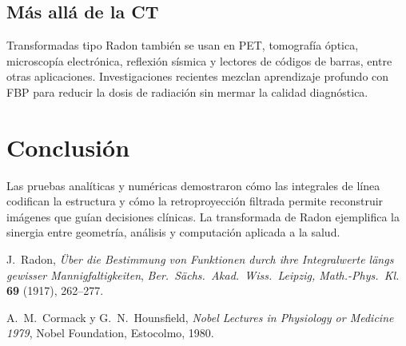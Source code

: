 \documentclass[11pt]{article}
\begin{document}
\subsection{Más allá de la CT}

Transformadas tipo Radon también se usan en PET, tomografía óptica,
microscopía electrónica, reflexión sísmica y lectores de códigos de
barras, entre otras aplicaciones.  Investigaciones recientes mezclan
aprendizaje profundo con FBP para reducir la dosis de radiación sin
mermar la calidad diagnóstica.

\section{Conclusión}

Las pruebas analíticas y numéricas demostraron cómo las integrales de
línea codifican la estructura y cómo la retroproyección filtrada permite
reconstruir imágenes que guían decisiones clínicas.  La transformada de
Radon ejemplifica la sinergia entre geometría, análisis y computación
aplicada a la salud.

\begin{thebibliography}{9}
J.~Radon,
\emph{Über die Bestimmung von Funktionen durch ihre Integralwerte
längs gewisser Mannigfaltigkeiten},
\textit{Ber.\ Sächs.\ Akad.\ Wiss.\ Leipzig, Math.-Phys.\ Kl.}
\textbf{69} (1917), 262–277.

A.~M.~Cormack y G.~N.~Hounsfield,
\emph{Nobel Lectures in Physiology or Medicine 1979},
Nobel Foundation, Estocolmo, 1980.
\end{thebibliography}
\end{document}
